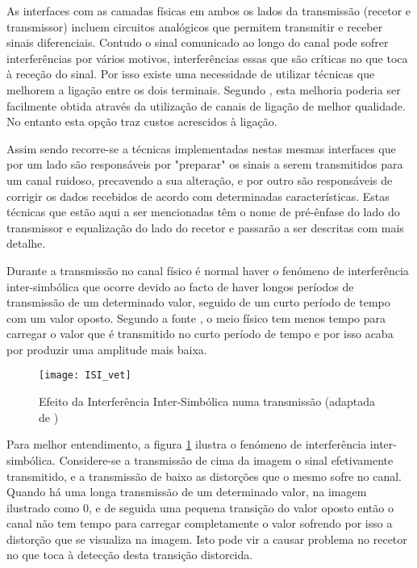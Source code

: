As interfaces com as camadas físicas em ambos os lados da transmissão (recetor e transmissor) incluem circuitos analógicos que permitem transmitir e receber sinais diferenciais. Contudo o sinal comunicado ao longo do canal pode sofrer interferências por vários motivos, interferências essas que são críticas no que toca à receção do sinal. Por isso existe uma necessidade de utilizar técnicas que melhorem a ligação entre os dois terminais. Segundo \cite{R012}, esta melhoria poderia ser facilmente obtida através da utilização de canais de ligação de melhor qualidade. No entanto esta opção traz custos acrescidos à ligação. 

Assim sendo recorre-se a técnicas implementadas nestas mesmas interfaces que por um lado são responsáveis por "preparar" os sinais a serem transmitidos para um canal ruidoso, precavendo a sua alteração, e por outro são responsáveis de corrigir os dados recebidos de acordo com determinadas características. Estas técnicas que estão aqui a ser mencionadas têm o nome de pré-ênfase do lado do transmissor e equalização do lado do recetor e passarão a ser descritas com mais detalhe.

Durante a transmissão no canal físico é normal haver o fenómeno de interferência inter-simbólica que ocorre devido ao facto de haver longos períodos de transmissão de um determinado valor, seguido de um curto período de tempo com um valor oposto. Segundo a fonte \cite{R032}, o meio físico tem menos tempo para carregar o valor que é transmitido no curto período de tempo e por isso acaba por produzir uma amplitude mais baixa.
\begin{figure}[h!]
	\begin{center}
		\leavevmode
		\texttt{[image: ISI\_vet]}
		\caption[Efeito da Interferência Inter-Simbólica numa transmissão]{Efeito da Interferência Inter-Simbólica numa transmissão (adaptada de \cite{R032})}
		\label{fig:isi}
	\end{center}
\end{figure}
Para melhor entendimento, a figura \ref{fig:isi} ilustra o fenómeno de interferência inter-simbólica. Considere-se a transmissão de cima da imagem o sinal efetivamente transmitido, e a transmissão de baixo as distorções que o mesmo sofre no canal. Quando há uma longa transmissão de um determinado valor, na imagem ilustrado como 0, e de seguida uma pequena transição do valor oposto então o canal não tem tempo para carregar completamente o valor sofrendo por isso a distorção que se visualiza na imagem. Isto pode vir a causar problema no recetor no que toca à detecção desta transição distorcida.


